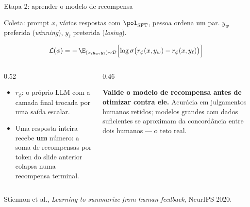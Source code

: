 \documentclass[aspectratio=169, 11pt]{beamer}
\newcommand{\psft}{\pol_{\mathrm{SFT}}}          %
\newcommand{\rphi}{r_{\phi}}                     %
\newcommand{\Dset}{\mathcal{D}}
\newcommand{\yw}{y_{w}}                          %
\newcommand{\yl}{y_{\ell}}                       %
\newcommand{\sig}{\sigma}
\begin{document}
\begin{frame}{Etapa 2: aprender o modelo de recompensa}

  Coleta: prompt $x$, várias respostas com $\psft$, pessoa ordena um par.
  $\yw$ preferida (\emph{winning}), $\yl$ preterida (\emph{losing}).

  \[
    \mathcal{L}(\phi) = -\,\E_{(x,\yw,\yl)\sim\Dset}
      \Bigl[\log \sig\bigl(\rphi(x,\yw) - \rphi(x,\yl)\bigr)\Bigr]
  \]

  \begin{columns}[T]
  \begin{column}{0.52\textwidth}
    \begin{itemize}\setlength{\itemsep}{0.2ex}
      \item $\rphi$: o próprio LLM com a camada final trocada por uma saída
        escalar.
      \item Uma resposta inteira recebe \textbf{um} número: a soma de
        recompensas por token do slide anterior colapsa numa recompensa
        terminal.
    \end{itemize}
  \end{column}
  \begin{column}{0.46\textwidth}
    \begin{ideiabox}
      \textbf{Valide o modelo de recompensa antes de otimizar contra ele.}
      Acurácia em julgamentos humanos retidos; modelos grandes com dados
      suficientes se aproximam da concordância entre dois humanos --- o teto
      real.
    \end{ideiabox}
  \end{column}
  \end{columns}

  {\scriptsize\color{rlCinza}Stiennon et al., \emph{Learning to summarize from
  human feedback}, NeurIPS 2020.}
\end{frame}
\end{document}
